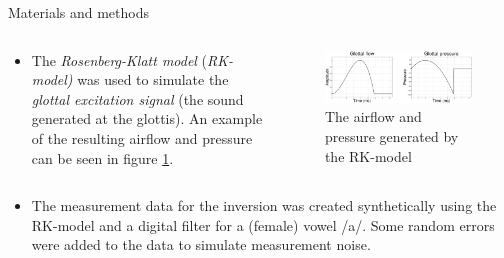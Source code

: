 \documentclass[final]{beamer}
\begin{document}
\begin{frame}[t]
\begin{columns}[t]
\begin{column}{.465\textwidth}

\begin{block}{Materials and methods}

\begin{columns} %
\begin{column}{.54\textwidth} %

\begin{itemize}

\item The \emph{Rosenberg-Klatt model} (\emph{RK-model)} \cite{rosenberg} was used to simulate the \emph{glottal excitation signal} (the sound generated at the glottis). An example of the resulting airflow and pressure can be seen in figure \ref{fig:klatt}.

\end{itemize}

\end{column}

\begin{column}{.43\textwidth} %

\begin{figure}[t]
\begin{center}
\includegraphics[width=\linewidth]{klatt.eps}
\end{center}
\caption{The airflow and pressure generated by the RK-model}
\label{fig:klatt}
\end{figure}

\end{column}
\end{columns} %

\begin{itemize}

\item The measurement data for the inversion was created synthetically using the RK-model and a digital filter for a (female) vowel /a/. Some random errors were added to the data to simulate measurement noise.


\end{itemize}
\end{block}
\end{column}
\end{columns}
\end{frame}
\end{document}
